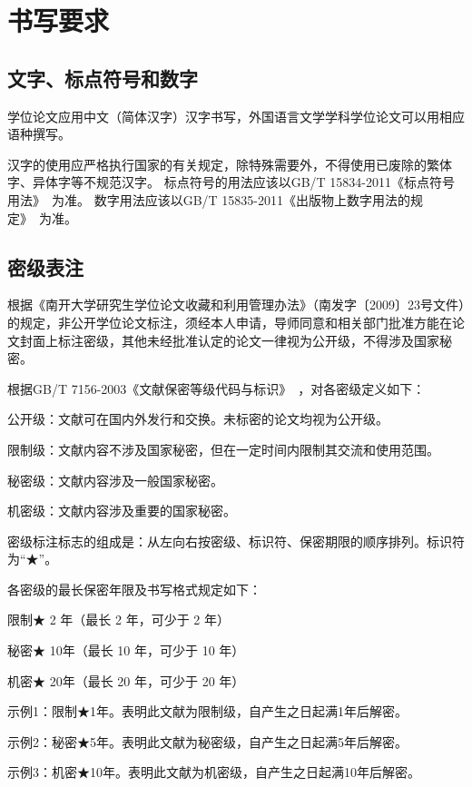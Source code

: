 \chapter{书写要求}
\label{chap:writing-requirements}

\section{文字、标点符号和数字}

学位论文应用中文（简体汉字）汉字书写，外国语言文学学科学位论文可以用相应语种撰写。

汉字的使用应严格执行国家的有关规定，除特殊需要外，不得使用已废除的繁体字、异体字等不规范汉字。
标点符号的用法应该以GB/T 15834-2011《标点符号用法》~\cite{SCSF00038090}为准。
数字用法应该以GB/T 15835-2011《出版物上数字用法的规定》~\cite{SCSF00036561}为准。

\section{密级表注}
\label{sec:writing-classification}

根据《南开大学研究生学位论文收藏和利用管理办法》（南发字〔2009〕23号文件）的规定，非公开学位论文标注，须经本人申请，导师同意和相关部门批准方能在论文封面上标注密级，其他未经批准认定的论文一律视为公开级，不得涉及国家秘密。

根据GB/T 7156-2003《文献保密等级代码与标识》~\cite{SCSF00000734}，对各密级定义如下：

公开级：文献可在国内外发行和交换。未标密的论文均视为公开级。

限制级：文献内容不涉及国家秘密，但在一定时间内限制其交流和使用范围。

秘密级：文献内容涉及一般国家秘密。

机密级：文献内容涉及重要的国家秘密。

密级标注标志的组成是：从左向右按密级、标识符、保密期限的顺序排列。标识符为“★”。

各密级的最长保密年限及书写格式规定如下：

限制★ 2 年（最长 2 年，可少于 2 年）

秘密★ 10年（最长 10 年，可少于 10 年）

机密★ 20年（最长 20 年，可少于 20 年）

示例1：限制★1年。表明此文献为限制级，自产生之日起满1年后解密。

示例2：秘密★5年。表明此文献为秘密级，自产生之日起满5年后解密。

示例3：机密★10年。表明此文献为机密级，自产生之日起满10年后解密。


